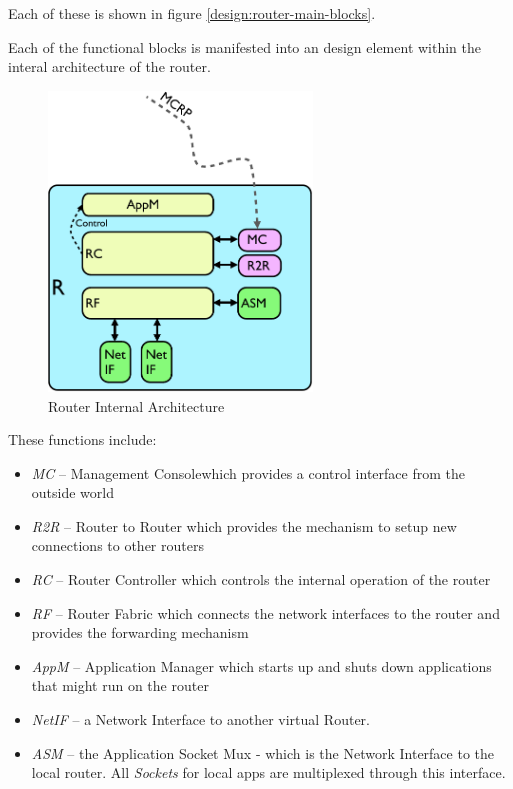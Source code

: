 \noindent Each of these is shown in figure \ref{design:router-main-blocks}.



Each of the functional blocks is manifested into an design
element within the interal architecture of the router.


\begin{figure}[h!]
    \centering
    \includegraphics[width=7cm]{images/router-elements}
    \caption{Router Internal Architecture}
    \label{design:router-elements}
\end{figure}


These functions include:

\begin{itemize}

\item \emph{MC} -- Management Consolewhich provides a control interface from the
  outside world

\item \emph{R2R} -- Router to Router which provides the mechanism to setup new
  connections to other routers

\item \emph{RC} -- Router Controller which controls the internal operation of
  the router

\item \emph{RF} -- Router Fabric which connects the network interfaces to
  the router and provides the forwarding mechanism

\item \emph{AppM} -- Application Manager which starts up and shuts down
  applications that might run on the router

\item \emph{NetIF} -- a Network Interface to another virtual Router.

\item \emph{ASM} -- the Application Socket Mux - which is the Network
  Interface to the local router. All \emph{Sockets} for local apps are
  multiplexed through this interface.

\end{itemize}

